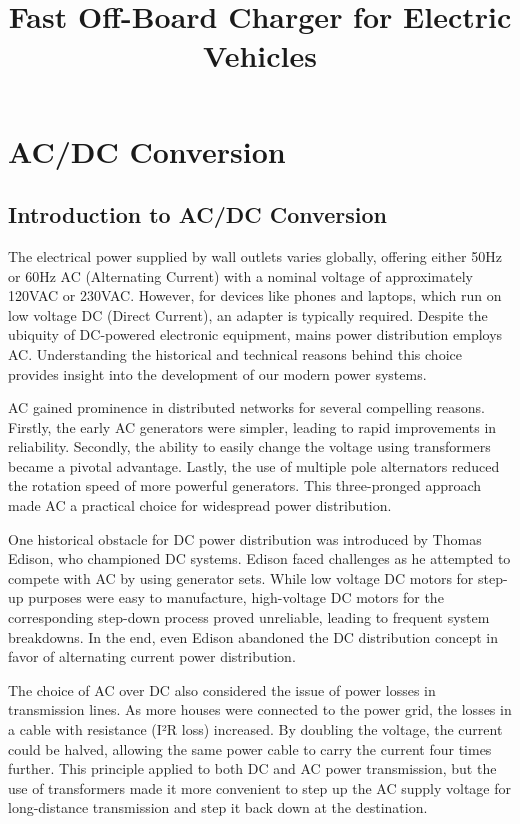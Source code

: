 \documentclass[12pt,a4paper]{book}
\title{Fast Off-Board Charger for Electric Vehicles}
\date{}
\begin{document}
\maketitle
\setcounter{tocdepth}{3}
\tableofcontents
\listoffigures
\listoftables

\part{AC/DC Conversion}

\chapter{Introduction to AC/DC Conversion}
The electrical power supplied by wall outlets varies globally, offering either 50Hz or 60Hz AC (Alternating Current) with a nominal voltage of approximately 120VAC or 230VAC. However, for devices like phones and laptops, which run on low voltage DC (Direct Current), an adapter is typically required. Despite the ubiquity of DC-powered electronic equipment, mains power distribution employs AC. Understanding the historical and technical reasons behind this choice provides insight into the development of our modern power systems.

AC gained prominence in distributed networks for several compelling reasons. Firstly, the early AC generators were simpler, leading to rapid improvements in reliability. Secondly, the ability to easily change the voltage using transformers became a pivotal advantage. Lastly, the use of multiple pole alternators reduced the rotation speed of more powerful generators. This three-pronged approach made AC a practical choice for widespread power distribution.

One historical obstacle for DC power distribution was introduced by Thomas Edison, who championed DC systems. Edison faced challenges as he attempted to compete with AC by using generator sets. While low voltage DC motors for step-up purposes were easy to manufacture, high-voltage DC motors for the corresponding step-down process proved unreliable, leading to frequent system breakdowns. In the end, even Edison abandoned the DC distribution concept in favor of alternating current power distribution\cite{acdc2018}.

The choice of AC over DC also considered the issue of power losses in transmission lines. As more houses were connected to the power grid, the losses in a cable with resistance (I²R loss) increased. By doubling the voltage, the current could be halved, allowing the same power cable to carry the current four times further. This principle applied to both DC and AC power transmission, but the use of transformers made it more convenient to step up the AC supply voltage for long-distance transmission and step it back down at the destination.
\end{document}
